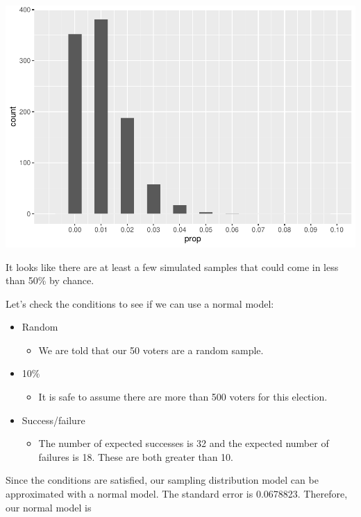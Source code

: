 \documentclass[
]{book}
\providecommand{\tightlist}{%
  \setlength{\itemsep}{0pt}\setlength{\parskip}{0pt}}
\begin{document}
\includegraphics{intro_stats_files/figure-latex/unnamed-chunk-375-1.pdf}

It looks like there are at least a few simulated samples that could come in less than 50\% by chance.

Let's check the conditions to see if we can use a normal model:

\begin{itemize}
\tightlist
\item
  Random

  \begin{itemize}
  \tightlist
  \item
    We are told that our 50 voters are a random sample.
  \end{itemize}
\item
  10\%

  \begin{itemize}
  \tightlist
  \item
    It is safe to assume there are more than 500 voters for this election.
  \end{itemize}
\item
  Success/failure

  \begin{itemize}
  \tightlist
  \item
    The number of expected successes is 32 and the expected number of failures is 18. These are both greater than 10.
  \end{itemize}
\end{itemize}

Since the conditions are satisfied, our sampling distribution model can be approximated with a normal model. The standard error is 0.0678823. Therefore, our normal model is
\end{document}
